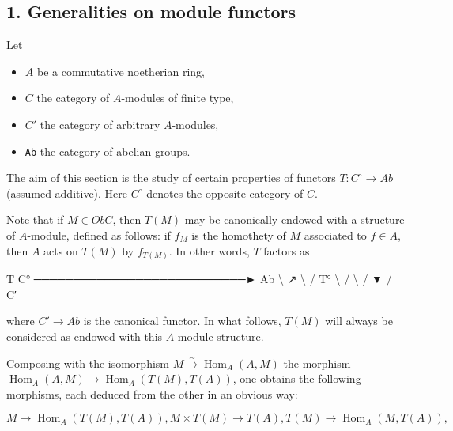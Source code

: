 \documentclass[
]{article}
\newenvironment{Shaded}{}{}
\newcommand{\NormalTok}[1]{#1}
\providecommand{\tightlist}{%
  \setlength{\itemsep}{0pt}\setlength{\parskip}{0pt}}
\begin{document}
\subsection{1. Generalities on module
functors}\label{generalities-on-module-functors}

Let

\begin{itemize}
\tightlist
\item
  \(A\) be a commutative noetherian ring,
\item
  \(C\) the category of \(A\)-modules of finite type,
\item
  \(C'\) the category of arbitrary \(A\)-modules,
\item
  \texttt{Ab} the category of abelian groups.
\end{itemize}

The aim of this section is the study of certain properties of functors
\(T : C^{\circ} \to Ab\) (assumed additive). Here \(C^{\circ}\) denotes
the opposite category of \(C\).

Note that if \(M \in Ob C\), then \(T(M)\) may be canonically endowed
with a structure of \(A\)-module, defined as follows: if \(f_{M}\) is
the homothety of \(M\) associated to \(f \in A\), then \(A\) acts on
\(T(M)\) by \(f_{T(M)}\). In other words, \(T\) factors as

\begin{Shaded}
\begin{Highlighting}[]
\NormalTok{                         T}
\NormalTok{        C°  ───────────────────────────►  Ab}
\NormalTok{           \textbackslash{}                            ↗}
\NormalTok{            \textbackslash{}                        /}
\NormalTok{         T°  \textbackslash{}                  /}
\NormalTok{              \textbackslash{}              /}
\NormalTok{               ▼          /}
\NormalTok{                  C′}
\end{Highlighting}
\end{Shaded}

where \(C' \to Ab\) is the canonical functor. In what follows, \(T(M)\)
will always be considered as endowed with this \(A\)-module structure.

Composing with the isomorphism
\(M \xrightarrow{\sim} \operatorname{Hom}_{A}(A, M)\) the morphism
\(\operatorname{Hom}_{A}(A, M) \to \operatorname{Hom}_{A}(T(M), T(A))\),
one obtains the following morphisms, each deduced from the other in an
obvious way:

\[
M \longrightarrow \operatorname{Hom}_{A}(T(M), T(A)),
M \times T(M) \longrightarrow T(A),
T(M) \longrightarrow \operatorname{Hom}_{A}(M, T(A)),
\]
\end{document}
